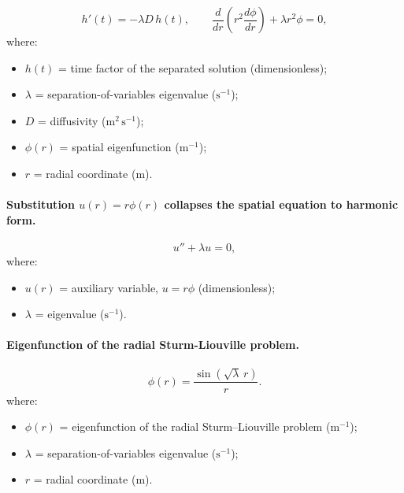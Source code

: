 \documentclass[11pt,a4paper]{article}
\begin{document}
\begin{equation}
h'(t) = -\lambda D\,h(t), \qquad \frac{d}{dr}\!\left(r^2\frac{d\phi}{dr}\right) + \lambda r^2\phi = 0,
\label{eq:b:sl-ode}
\end{equation}
\vspace{-0.3em}
\noindent where:

\begin{itemize}[leftmargin=1.6em,itemsep=1pt,topsep=3pt,parsep=0pt]
  \item $h(t)$ = time factor of the separated solution (dimensionless);
  \item $\lambda$ = separation-of-variables eigenvalue ($\mathrm{s^{-1}}$);
  \item $D$ = diffusivity ($\mathrm{m^{2}\,s^{-1}}$);
  \item $\phi(r)$ = spatial eigenfunction ($\mathrm{m^{-1}}$);
  \item $r$ = radial coordinate ($\mathrm{m}$).
\end{itemize}


\paragraph{Substitution $u(r)=r\phi(r)$ collapses the spatial equation to harmonic form.}

\begin{equation}
u'' + \lambda u = 0,
\label{eq:b:harmonic}
\end{equation}
\vspace{-0.3em}
\noindent where:

\begin{itemize}[leftmargin=1.6em,itemsep=1pt,topsep=3pt,parsep=0pt]
  \item $u(r)$ = auxiliary variable, $u=r\phi$ (dimensionless);
  \item $\lambda$ = eigenvalue ($\mathrm{s^{-1}}$).
\end{itemize}


\paragraph{Eigenfunction of the radial Sturm-Liouville problem.}

\begin{equation}
\phi(r) = \frac{\sin\!\left(\sqrt{\lambda}\,r\right)}{r}.
\label{eq:b:eigfun}
\end{equation}
\vspace{-0.3em}
\noindent where:

\begin{itemize}[leftmargin=1.6em,itemsep=1pt,topsep=3pt,parsep=0pt]
  \item $\phi(r)$ = eigenfunction of the radial Sturm--Liouville problem ($\mathrm{m^{-1}}$);
  \item $\lambda$ = separation-of-variables eigenvalue ($\mathrm{s^{-1}}$);
  \item $r$ = radial coordinate ($\mathrm{m}$).
\end{itemize}
\end{document}
